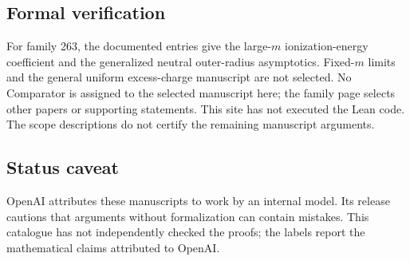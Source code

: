 \documentclass[11pt]{article}
\begin{document}
\subsection{Formal verification}
For family 263, the documented entries give the large-$m$ ionization-energy coefficient and the generalized neutral outer-radius asymptotics. Fixed-$m$ limits and the general uniform excess-charge manuscript are not selected. No Comparator is assigned to the selected manuscript here; the family page selects other papers or supporting statements. This site has not executed the Lean code. The scope descriptions do not certify the remaining manuscript arguments.

\subsection{Status caveat}
OpenAI attributes these manuscripts to work by an internal model. Its release cautions that arguments without formalization can contain mistakes. This catalogue has not independently checked the proofs; the labels report the mathematical claims attributed to OpenAI.
\end{document}
